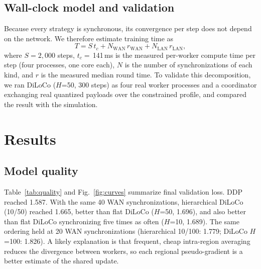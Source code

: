 \documentclass[conference]{IEEEtran}
\begin{document}
\subsection{Wall-clock model and validation}
Because every strategy is synchronous, its convergence per step does not depend on the network. We therefore estimate training time as
\begin{equation}
T = S\,t_c + N_{\mathrm{WAN}}\,r_{\mathrm{WAN}} + N_{\mathrm{LAN}}\,r_{\mathrm{LAN}},
\end{equation}
where $S=2{,}000$ steps, $t_c=$\,141\,ms is the measured per-worker compute time per step (four processes, one core each), $N$ is the number of synchronizations of each kind, and $r$ is the measured median round time. To validate this decomposition, we ran DiLoCo ($H$=50, 300 steps) as four real worker processes and a coordinator exchanging real quantized payloads over the constrained profile, and compared the result with the simulation.

\section{Results}
\subsection{Model quality}
Table~\ref{tab:quality} and Fig.~\ref{fig:curves} summarize final validation loss. DDP reached 1.587. With the same 40 WAN synchronizations, hierarchical DiLoCo (10/50) reached 1.665, better than flat DiLoCo ($H$=50, 1.696), and also better than flat DiLoCo synchronizing five times as often ($H$=10, 1.689). The same ordering held at 20 WAN synchronizations (hierarchical 10/100: 1.779; DiLoCo $H$=100: 1.826). A likely explanation is that frequent, cheap intra-region averaging reduces the divergence between workers, so each regional pseudo-gradient is a better estimate of the shared update.
\end{document}
